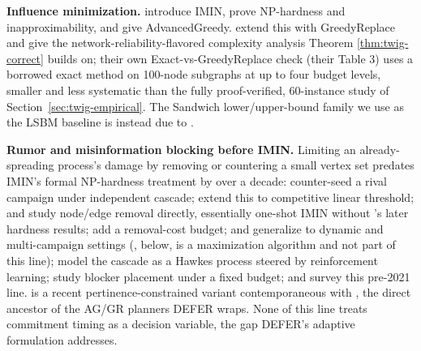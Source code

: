 \documentclass[ijoc,sglanonrev]{informs4}
\begin{document}
\textbf{Influence minimization.} \citet{xie2023} introduce IMIN, prove
NP-hardness and inapproximability, and give AdvancedGreedy. \citet{xie2024}
extend this with GreedyReplace and give the network-reliability-flavored
complexity analysis Theorem \ref{thm:twig-correct} builds on; their own
Exact-vs-GreedyReplace check (their Table 3) uses a borrowed exact method
on 100-node subgraphs at up to four budget levels, smaller and less
systematic than the fully proof-verified, 60-instance study of
Section~\ref{sec:twig-empirical}. The Sandwich lower/upper-bound family we
use as the LSBM baseline is instead due to \citet{wang2024sandwich}.

\textbf{Rumor and misinformation blocking before IMIN.} Limiting an
already-spreading process's damage by removing or countering a small
vertex set predates IMIN's formal NP-hardness treatment by over a decade:
\citet{budak2011} counter-seed a rival campaign under independent
cascade; \citet{he2012} extend this to competitive linear threshold;
\citet{nguyen2012} and \citet{wang2013blocking} study node/edge removal
directly, essentially one-shot IMIN without \citet{xie2023}'s later
hardness results; \citet{fan2013} add a removal-cost budget;
\citet{wang2016drimux} and \citet{tong2018} generalize to dynamic and
multi-campaign settings (\citet{tong2017}, below, is a maximization
algorithm and not part of this line); \citet{farajtabar2017} model the
cascade as a Hawkes process steered by reinforcement learning;
\citet{yan2020} study blocker placement under a fixed budget; and
\citet{zareie2021} survey this pre-2021 line. \citet{xiang2024} is a
recent pertinence-constrained variant contemporaneous with
\citet{xie2024}, the direct ancestor of the AG/GR planners DEFER wraps.
None of this line treats commitment timing as a decision variable, the
gap DEFER's adaptive formulation addresses.
\end{document}
